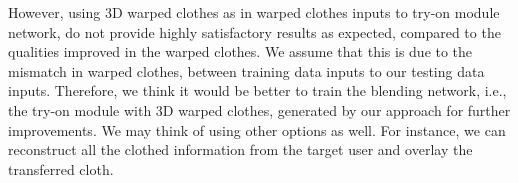 However, using 3D warped clothes as in warped clothes inputs to try-on module network, do not provide highly satisfactory results as expected, compared to the qualities improved in the warped clothes. We assume that this is due to the mismatch in warped clothes, between training data inputs to our testing data inputs. Therefore, we think it would be better to train the blending network, i.e., the try-on module with 3D warped clothes, generated by our approach for further improvements. We may think of using other options as well. For instance, we can reconstruct all the clothed information from the target user and overlay the transferred cloth.






